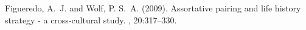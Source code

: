 \documentclass[twoside]{article}
\begin{document}
\begin{multicols}{2}
\begin{thebibliography}{99} %

Figueredo, A.~J. and Wolf, P. S.~A. (2009).
\newblock Assortative pairing and life history strategy - a cross-cultural
  study.
, 20:317--330.
 
\end{thebibliography}


\end{multicols}
\end{document}
